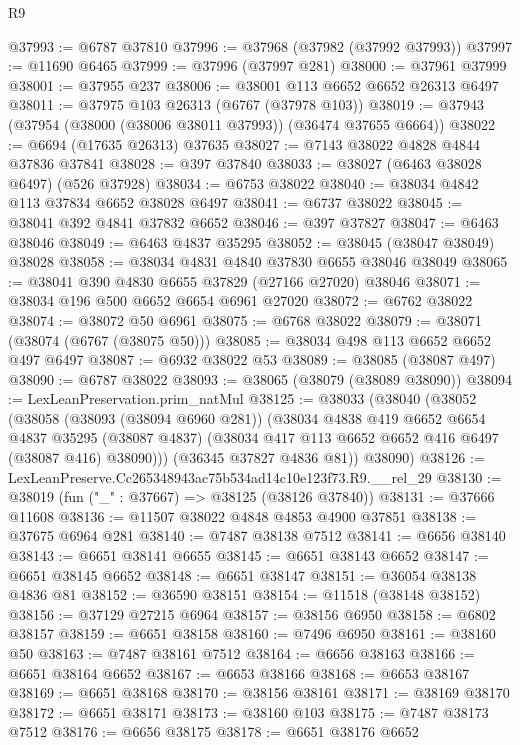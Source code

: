 \begin{lexlean}{R9}
\begin{coremodule}
@37993 := @6787 @37810
@37996 := @37968 (@37982 (@37992 @37993))
@37997 := @11690 @6465
@37999 := @37996 (@37997 @281)
@38000 := @37961 @37999
@38001 := @37955 @237
@38006 := @38001 @113 @6652 @6652 @26313 @6497
@38011 := @37975 @103 @26313 (@6767 (@37978 @103))
@38019 := @37943 (@37954 (@38000 (@38006 @38011 @37993)) (@36474 @37655 @6664))
@38022 := @6694 (@17635 @26313) @37635
@38027 := @7143 @38022 @4828 @4844 @37836 @37841
@38028 := @397 @37840
@38033 := @38027 (@6463 @38028 @6497) (@526 @37928)
@38034 := @6753 @38022
@38040 := @38034 @4842 @113 @37834 @6652 @38028 @6497
@38041 := @6737 @38022
@38045 := @38041 @392 @4841 @37832 @6652
@38046 := @397 @37827
@38047 := @6463 @38046
@38049 := @6463 @4837 @35295
@38052 := @38045 (@38047 @38049) @38028
@38058 := @38034 @4831 @4840 @37830 @6655 @38046 @38049
@38065 := @38041 @390 @4830 @6655 @37829 (@27166 @27020) @38046
@38071 := @38034 @196 @500 @6652 @6654 @6961 @27020
@38072 := @6762 @38022
@38074 := @38072 @50 @6961
@38075 := @6768 @38022
@38079 := @38071 (@38074 (@6767 (@38075 @50)))
@38085 := @38034 @498 @113 @6652 @6652 @497 @6497
@38087 := @6932 @38022 @53
@38089 := @38085 (@38087 @497)
@38090 := @6787 @38022
@38093 := @38065 (@38079 (@38089 @38090))
@38094 := LexLeanPreservation.prim_natMul
@38125 := @38033
    (@38040
      (@38052
        (@38058
          (@38093 (@38094 @6960 @281))
          (@38034
            @4838
            @419
            @6652
            @6654
            @4837
            @35295
            (@38087 @4837)
            (@38034 @417 @113 @6652 @6652 @416 @6497 (@38087 @416) @38090)))
        (@36345 @37827 @4836 @81))
      @38090)
@38126 := LexLeanPreserve.Cc265348943ac75b534ad14c10e123f73.R9.__rel_29
@38130 := @38019 (fun ("_" : @37667) => @38125 (@38126 @37840))
@38131 := @37666 @11608
@38136 := @11507 @38022 @4848 @4853 @4900 @37851
@38138 := @37675 @6964 @281
@38140 := @7487 @38138 @7512
@38141 := @6656 @38140
@38143 := @6651 @38141 @6655
@38145 := @6651 @38143 @6652
@38147 := @6651 @38145 @6652
@38148 := @6651 @38147
@38151 := @36054 @38138 @4836 @81
@38152 := @36590 @38151
@38154 := @11518 (@38148 @38152)
@38156 := @37129 @27215 @6964
@38157 := @38156 @6950
@38158 := @6802 @38157
@38159 := @6651 @38158
@38160 := @7496 @6950
@38161 := @38160 @50
@38163 := @7487 @38161 @7512
@38164 := @6656 @38163
@38166 := @6651 @38164 @6652
@38167 := @6653 @38166
@38168 := @6653 @38167
@38169 := @6651 @38168
@38170 := @38156 @38161
@38171 := @38169 @38170
@38172 := @6651 @38171
@38173 := @38160 @103
@38175 := @7487 @38173 @7512
@38176 := @6656 @38175
@38178 := @6651 @38176 @6652

\end{coremodule}
\end{lexlean}
